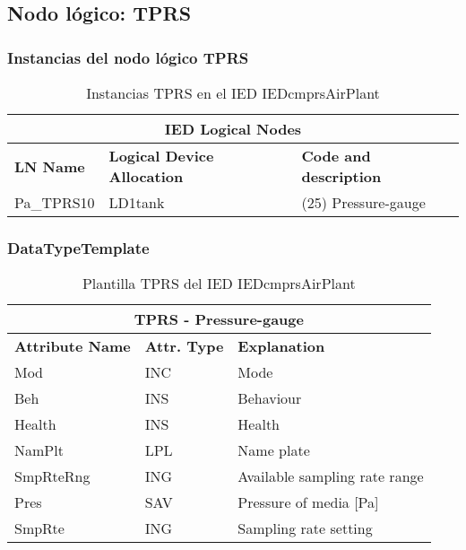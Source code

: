 
\subsection{Nodo l\'ogico: 			 TPRS}

    \subsubsection{Instancias del nodo l\'ogico TPRS}
    \begin{table}[H]
    \begin{center}
    \begin{tabular}{|l|l|p{6.8cm}|}
            \hline
            \multicolumn{3}{|c|}{\cellcolor[gray]{0.8} \textbf{IED Logical Nodes} } \\
            \hline
            \textbf{LN Name} & \textbf{Logical Device Allocation} & \textbf{Code and description} \\
            \hline
            Pa\_TPRS10 & LD1tank & (25) Pressure-gauge \\
            \hline
    \end{tabular}
    \caption{Instancias TPRS en el IED IEDcmprsAirPlant}
    \label{table:lnInstTPRS_gauge}
    \end{center}
    \end{table}
    
    
    
    \subsubsection{DataTypeTemplate}
    \begin{table}[H]
    \begin{center}
    \begin{tabular}{|l|l|p{8.5cm}|}
            \hline
            \multicolumn{3}{|c|}{\cellcolor[gray]{0.8} \textbf{ TPRS}  - Pressure-gauge} \\
            \hline
            \textbf{Attribute Name} & \textbf{Attr. Type} & \textbf{Explanation} \\
            \hline 
            Mod & INC & Mode \\
            \hline
            Beh & INS & Behaviour \\
            \hline
            Health & INS & Health \\
            \hline
            NamPlt & LPL & Name plate \\
            \hline
            SmpRteRng & ING & Available sampling rate range \\
            \hline
            Pres & SAV & Pressure of media [Pa] \\
            \hline
            SmpRte & ING & Sampling rate setting \\
            \hline
    \end{tabular}
    \caption{Plantilla TPRS del IED IEDcmprsAirPlant}
    \label{table:lnTypeTPRS_gauge}
    \end{center}
    \end{table}
    
    
    